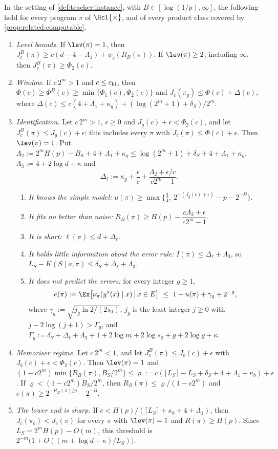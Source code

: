 \begin{theorem}\label{thm:teacher:main}
In the setting of \cref{def:teacher:instance}, with $B\in[\log(1/p),\infty]$, the following hold for every program $\pi$ of $\Hcl{\times}$, and of every product class covered by \cref{prop:related:computable}.
\begin{enumerate}[label=(\roman*),start=0]
\item \emph{Level bounds.} If $\lev(\pi)=1$, then $J^B_c(\pi)\ge c(d-4-\Lambda_1)+\psi_c(R_B(\pi))$. If $\lev(\pi)\ge2$, including $\infty$, then $J^B_c(\pi)\ge\Phi_2(c)$.
\item \emph{Window.} If $c\,2^m>1$ and $c\le c_{\rm hi}$, then $\Phi(c)\ge\Phi^B(c)\ge\min\{\Phi_1(c),\Phi_2(c)\}$ and $J_c(\pi_g)\le\Phi(c)+\Delta(c)$, where $\Delta(c)\le c(4+\Lambda_1+\kappa_g)+(\log(2^m+1)+\delta_S)/2^m$.
\item \emph{Identification.} Let $c\,2^m>1$, $\epsilon\ge0$ and $J_g(c)+\epsilon<\Phi_2(c)$, and let $J^B_c(\pi)\le J_g(c)+\epsilon$; this includes every $\pi$ with $J_c(\pi)\le\Phi(c)+\epsilon$. Then $\lev(\pi)=1$. Put $\Lambda_2:=2^mH(p)-B_S+4+\Lambda_1+\kappa_g\le\log(2^m+1)+\delta_S+4+\Lambda_1+\kappa_g$, $\Lambda_3:=4+2\log d+\kappa$ and
\[
\Delta_\ell:=\kappa_g+\frac\epsilon c+\frac{\Lambda_2+\epsilon/c}{c2^m-1}.
\]
\begin{enumerate}[label=(\alph*)]
\item \emph{It knows the simple model:} $u(\pi)\ge\max\{\frac34,\ 2^{-(J_g(c)+\epsilon)}-p-2^{-B}\}$.
\item \emph{It fits no better than noise:} $R_B(\pi)\ge H(p)-\dfrac{c\Lambda_2+\epsilon}{c2^m-1}$.
\item \emph{It is short:} $\ell(\pi)\le d+\Delta_\ell$.
\item \emph{It holds little information about the error rule:} $I(\pi)\le\Delta_\ell+\Lambda_3$, so $L_S-K(S\mid a,\pi)\le\delta_S+\Delta_\ell+\Lambda_3$.
\item \emph{It does not predict the errors:} for every integer $g\ge1$,
\[
e(\pi):=\Ex\big[\nu_\pi(y^*(x)\mid x)\,\big|\,x\in E\big]\ \le\ 1-u(\pi)+\gamma_g+2^{-g},
\]
where $\gamma_g:=\sqrt{j_g\ln2/(2s_0)}$, $j_g$ is the least integer $j\ge0$ with $j-2\log(j+1)>\Gamma_g$, and $\Gamma_g:=\delta_S+\Delta_\ell+\Lambda_3+1+2\log m+2\log s_0+g+2\log g+\kappa$.
\end{enumerate}
\item \emph{Memoriser regime.} Let $c\,2^m<1$, and let $J^B_c(\pi)\le J_b(c)+\epsilon$ with $J_b(c)+\epsilon<\Phi_2(c)$. Then $\lev(\pi)=1$ and $(1-c2^m)\min\{R_B(\pi),B_S/2^m\}\le\varrho:=c(\lceil L_S\rceil-L_S+\delta_S+4+\Lambda_1+\kappa_b)+\epsilon$. If $\varrho<(1-c2^m)B_S/2^m$, then $R_B(\pi)\le\varrho/(1-c2^m)$ and $e(\pi)\ge2^{-R_B(\pi)/p}-2^{-B}$.
\item \emph{The lower end is sharp.} If $c<H(p)/(\lceil L_S\rceil+\kappa_b+4+\Lambda_1)$, then $J_c(\pi_b)<J_c(\pi)$ for every $\pi$ with $\lev(\pi)=1$ and $R(\pi)\ge H(p)$. Since $L_S=2^mH(p)-O(m)$, this threshold is $2^{-m}\big(1+O((m+\log d+\kappa)/L_S)\big)$.
\end{enumerate}
\end{theorem}

